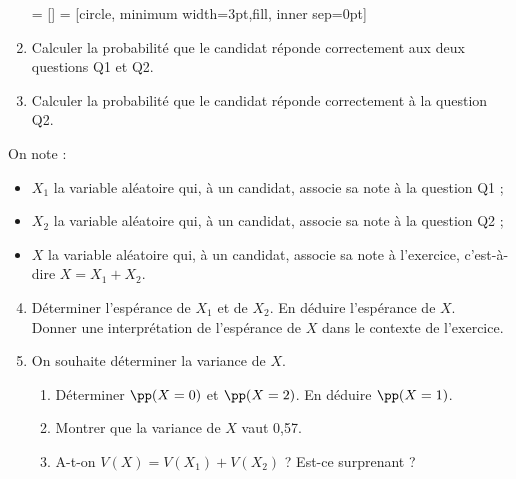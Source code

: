 \documentclass[11pt,fleqn, openany]{book} %
\begin{document}
\begin{exercise}[topic=lgn04, subtitle={(Sujet zéro 2024)}]
\begin{enumerate}
 = []
 = [circle, minimum width=3pt,fill, inner sep=0pt]


\begin{center}
\end{center}

\item Calculer la probabilité que le candidat réponde correctement aux deux questions Q1 et Q2.
\item Calculer la probabilité que le candidat réponde correctement à la question Q2.\end{enumerate}
On note :
\begin{itemize}
\item $X_1$ la variable aléatoire qui, à un candidat, associe sa note à la question Q1 ;
\item $X_2$ la variable aléatoire qui, à un candidat, associe sa note à la question Q2 ;
\item $X$ la variable aléatoire qui, à un candidat, associe sa note à l'exercice, c'est-à-dire $X = X_1 + X_2$.
\end{itemize}

\begin{enumerate}
\setcounter{enumi}{3}
\item Déterminer l'espérance de $X_1$ et de $X_2$. En déduire l'espérance de $X$.\\ Donner une interprétation de l'espérance de $X$ dans le contexte de l'exercice.
\item On souhaite déterminer la variance de $X$.
\begin{enumerate}
\item Déterminer $\pp(X = 0)$ et $\pp(X = 2)$. En déduire $\pp(X = 1)$.
\item Montrer que la variance de $X$ vaut 0,57.
\item A-t-on $V(X) = V(X_1)+V(X_2)$ ? Est-ce surprenant ?
\end{enumerate} 
\end{enumerate}


\end{exercise}
\end{document}
